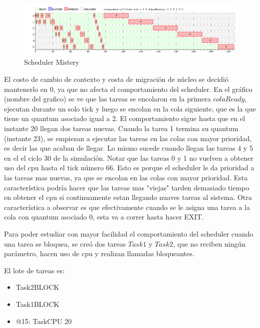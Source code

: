 \begin{figure}[H]
  \centering
    \includegraphics[width=1\textwidth]{../ej7/taskCpuMistery.png}
    \caption{Scheduler Mistery}
\end{figure}


El costo de cambio de contexto y costa de migración de núcleo se decidió mantenerlo en 0, ya que no afecta el comportamiento del scheduler.
En el gráfico (nombre del grafico) se ve que las tareas se encolaron en la primera $colaReady$, ejecutan durante un solo tick y luego se encolan en 
la cola siguiente, que es la que tiene un quantum asociado igual a 2. El comportamiento sigue hasta que en el instante 20 llegan dos tareas nuevas.
Cuando la tarea 1 termina su quantum (instante 23), se empiezan a ejecutar las tareas en las colas con mayor prioridad, es decir 
las que acaban de llegar. Lo mismo sucede cuando llegan las tareas 4 y 5 en el el ciclo 30 de la simulación. Notar que las tareas 0 y 1 no vuelven
a obtener uso del cpu hasta el tick número 66. Esto es porque el scheduler le da prioridad a las tareas mas nuevas, ya que se encolan en las colas con
mayor prioridad. Esta característica podría hacer que las tareas mas "viejas" tarden demasiado tiempo en obtener el cpu si continuamente estan llegando 
nuaves tareas al sistema. 
Otra característica a observar es que efectivamente cuando se le asigna una tarea a la cola con quantum asociado 0, esta va a correr hasta hacer EXIT.

Para poder estudiar con mayor facilidad el comportamiento del scheduler cuando una tarea se bloquea, se creó dos tareas $Task1$ y $Task2$, que no reciben ningún
parámetro, hacen uso de cpu y realizan llamadas bloqueantes. 

El lote de tareas es:

\begin{itemize}

\item Task2BLOCK
\item Task1BLOCK
\item @15:
	TaskCPU 20

\end{itemize}

